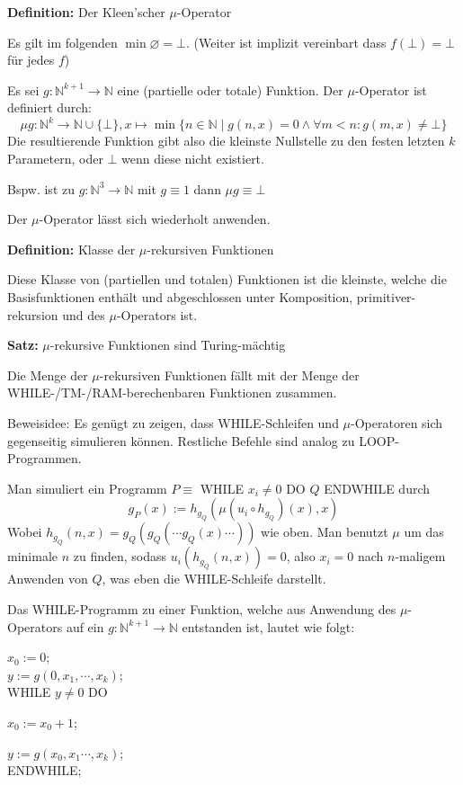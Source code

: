 \documentclass[a4paper,graphics,11pt]{article}
\begin{document}
\strut

\textbf{Definition:} Der Kleen'scher $\mu$-Operator

Es gilt im folgenden $\min \varnothing = \bot$. (Weiter ist implizit vereinbart dass $f(\bot) = \bot$ für jedes $f$)

Es sei $g: \mathbb{N}^{k+1} \to \mathbb{N}$ eine (partielle oder totale) Funktion.
Der $\mu$-Operator ist definiert durch:
$$
    \mu g : \mathbb{N}^k \to \mathbb{N}\cup\{\bot\},
    x \mapsto \min\{n \in \mathbb{N}\mid g(n,x) = 0 \land \forall m < n: g(m,x) \neq \bot\}
$$
Die resultierende Funktion gibt also die kleinste Nullstelle zu den festen letzten $k$ Parametern,
oder $\bot$ wenn diese nicht existiert.

Bspw. ist zu $g: \mathbb{N}^3 \to \mathbb{N}$ mit $g \equiv 1$ dann $\mu g \equiv \bot$

Der $\mu$-Operator lässt sich wiederholt anwenden.

\strut

\textbf{Definition:} Klasse der $\mu$-rekursiven Funktionen

Diese Klasse von (partiellen und totalen) Funktionen ist die kleinste, welche die Basisfunktionen enthält
und abgeschlossen unter Komposition, primitiver-rekursion und des $\mu$-Operators ist.

\newpage

\textbf{Satz:} $\mu$-rekursive Funktionen sind Turing-mächtig

Die Menge der $\mu$-rekursiven Funktionen fällt mit der Menge der WHILE-/TM-/RAM-berechenbaren Funktionen
zusammen.

Beweisidee: Es genügt zu zeigen, dass WHILE-Schleifen und $\mu$-Operatoren sich gegenseitig simulieren können.
Restliche Befehle sind analog zu LOOP-Programmen.

Man simuliert ein Programm $P \equiv$ WHILE $x_i \neq 0$ DO $Q$ ENDWHILE durch
$$
    g_P(x)
    := h_{g_Q}(\mu (u_i\circ h_{g_Q})(x), x)
$$
Wobei $h_{g_Q}(n,x) = g_Q(g_Q(\cdots g_Q(x)\cdots))$ wie oben. Man benutzt $\mu$ um das minimale $n$ zu
finden, sodass $u_i(h_{g_Q}(n,x)) = 0$, also $x_i = 0$ nach $n$-maligem Anwenden von $Q$, was eben
die WHILE-Schleife darstellt.

\strut

Das WHILE-Programm zu einer Funktion,
welche aus Anwendung des $\mu$-Operators auf ein $g: \mathbb{N}^{k+1} \to \mathbb{N}$ entstanden ist,
lautet wie folgt:

$x_0 := 0$;\\
$y := g(0,x_1,\cdots,x_k)$;\\
WHILE $y\neq 0$ DO\\
\strut\qquad$x_0 := x_0 +1$;\\
\strut\qquad$y := g(x_0,x_1\cdots,x_k)$;\\
ENDWHILE;
\end{document}
